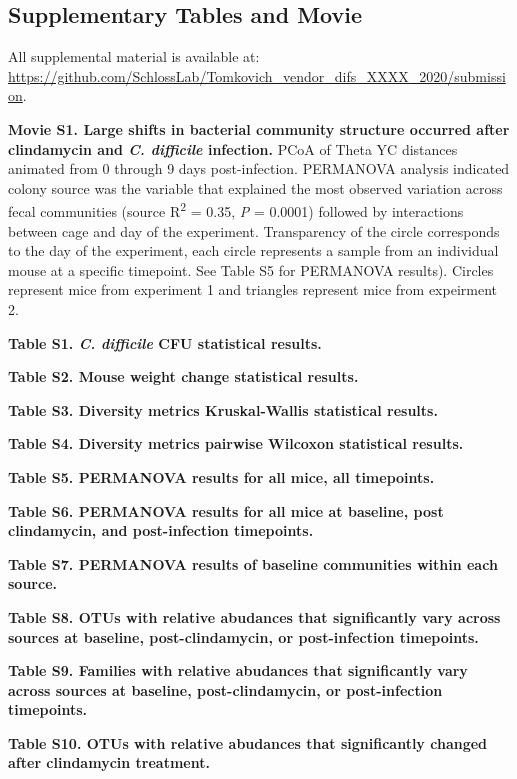 \documentclass[11pt,]{article}
\begin{document}
\newpage

\subsection{Supplementary Tables and
Movie}\label{supplementary-tables-and-movie}

All supplemental material is available at:
\url{https://github.com/SchlossLab/Tomkovich_vendor_difs_XXXX_2020/submission}.

\textbf{Movie S1. Large shifts in bacterial community structure occurred
after clindamycin and \emph{C. difficile} infection.} PCoA of Theta YC
distances animated from 0 through 9 days post-infection. PERMANOVA
analysis indicated colony source was the variable that explained the
most observed variation across fecal communities (source
R\textsuperscript{2} = 0.35, \emph{P} = 0.0001) followed by interactions
between cage and day of the experiment. Transparency of the circle
corresponds to the day of the experiment, each circle represents a
sample from an individual mouse at a specific timepoint. See Table S5
for PERMANOVA results). Circles represent mice from experiment 1 and
triangles represent mice from expeirment 2.

\textbf{Table S1. \emph{C. difficile} CFU statistical results.}

\textbf{Table S2. Mouse weight change statistical results.}

\textbf{Table S3. Diversity metrics Kruskal-Wallis statistical results.}

\textbf{Table S4. Diversity metrics pairwise Wilcoxon statistical
results.}

\textbf{Table S5. PERMANOVA results for all mice, all timepoints.}

\textbf{Table S6. PERMANOVA results for all mice at baseline, post
clindamycin, and post-infection timepoints.}

\textbf{Table S7. PERMANOVA results of baseline communities within each
source.}

\textbf{Table S8. OTUs with relative abudances that significantly vary
across sources at baseline, post-clindamycin, or post-infection
timepoints.}

\textbf{Table S9. Families with relative abudances that significantly
vary across sources at baseline, post-clindamycin, or post-infection
timepoints.}

\textbf{Table S10. OTUs with relative abudances that significantly
changed after clindamycin treatment.}
\end{document}
